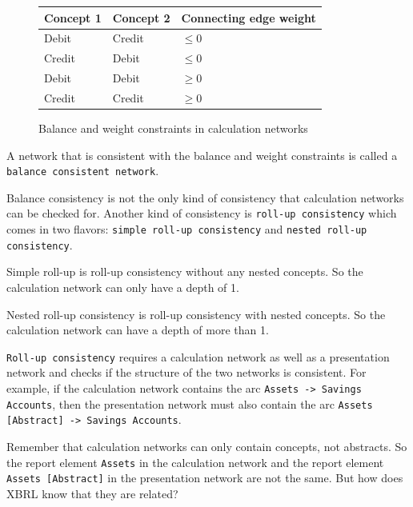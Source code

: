 \begin{figure}[H]
    \label{fig:balance_weight_constraints}
    \centering
    \begin{tabular}{|l|l|l|}
        \hline
        \textbf{Concept 1} & \textbf{Concept 2} & \textbf{Connecting edge weight} \\ \hline
        Debit              & Credit             & $\leq 0$        \\ \hline
        Credit             & Debit              & $\leq 0$        \\ \hline
        Debit              & Debit              & $\geq 0$        \\ \hline
        Credit             & Credit             & $\geq 0$        \\ \hline
    \end{tabular}
    \caption{Balance and weight constraints in calculation networks}
\end{figure}

A network that is consistent with the balance and weight constraints is called a \texttt{balance consistent network}.\cite{fourny2023xbrl}

Balance consistency is not the only kind of consistency that calculation networks can be checked for.
Another kind of consistency is \texttt{roll-up consistency} which comes in two flavors: \texttt{simple roll-up consistency} and \texttt{nested roll-up consistency}. 

Simple roll-up is roll-up consistency without any nested concepts. 
So the calculation network can only have a depth of 1.

Nested roll-up consistency is roll-up consistency with nested concepts.
So the calculation network can have a depth of more than 1.

\texttt{Roll-up consistency} requires a calculation network as well as a presentation network and checks if the structure of the two networks is consistent.
For example, if the calculation network contains the arc \texttt{Assets -> Savings Accounts}, 
then the presentation network must also contain the arc \texttt{Assets [Abstract] -> Savings Accounts}.

Remember that calculation networks can only contain concepts, not abstracts. 
So the report element \texttt{Assets} in the calculation network and the report element \texttt{Assets [Abstract]} in the presentation network are not the same.
But how does XBRL know that they are related?

